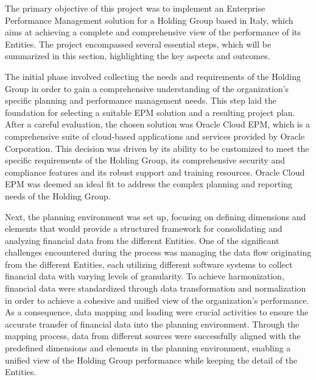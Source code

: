\documentclass[12pt,a4paper,openright,twoside]{book}
\begin{document}

The primary objective of this project was to implement an Enterprise Performance Management solution for a Holding Group based in Italy, which aims at achieving a complete and comprehensive view of the performance of its Entities. 
%
The project encompassed several essential steps, which will be summarized in this section, highlighting the key aspects and outcomes.

The initial phase involved collecting the needs and requirements of the Holding Group in order to gain a comprehensive understanding of the organization's specific planning and performance management needs.
%
This step laid the foundation for selecting a suitable EPM solution and a resulting project plan.
%
After a careful evaluation, the chosen solution was Oracle Cloud EPM, which is a comprehensive suite of cloud-based applications and services provided by Oracle Corporation.
%
This decision was driven by its ability to be customized to meet the specific requirements of the Holding Group, its comprehensive security and compliance features and its robust support and training resources. 
%
Oracle Cloud EPM was deemed an ideal fit to address the complex planning and reporting needs of the Holding Group.

Next, the planning environment was set up, focusing on defining dimensions and elements that would provide a structured framework for consolidating and analyzing financial data from the different Entities. 
%
One of the significant challenges encountered during the process was managing the data flow originating from the different Entities, each utilizing different software systems to collect financial data with varying levels of granularity. 
%
To achieve harmonization, financial data were standardized through data transformation and normalization in order to achieve a cohesive and unified view of the organization's performance.
%
As a consequence, data mapping and loading were crucial activities to ensure the accurate transfer of financial data into the planning environment. 
%
Through the mapping process, data from different sources were successfully aligned with the predefined dimensions and elements in the planning environment, enabling a unified view of the Holding Group performance while keeping the detail of the Entities.
\end{document}
